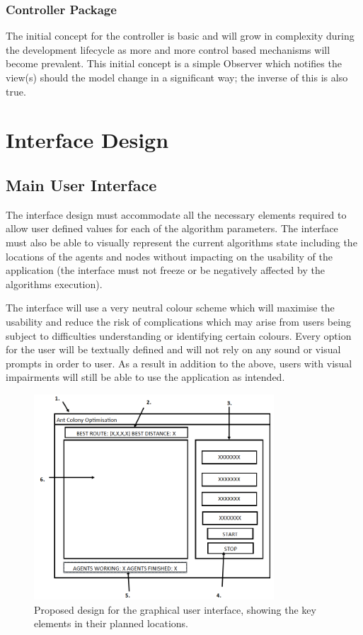 \subsubsection{Controller Package}
The initial concept for the controller is basic and will grow in complexity during the development lifecycle as more and more control based mechanisms will become prevalent. This initial concept is a simple Observer which notifies the view(s) should the model change in a significant way; the inverse of this is also true.

\section{Interface Design}
\subsection{Main User Interface}
\label{ssec:mainUI}
The interface design must accommodate all the necessary elements required to allow user defined values for each of the algorithm parameters. The interface must also be able to visually represent the current algorithms state including the locations of the agents and nodes without impacting on the usability of the application (the interface must not freeze or be negatively affected by the algorithms execution).

The interface will use a very neutral colour scheme which will maximise the usability and reduce the risk of complications which may arise from users being subject to difficulties understanding or identifying certain colours. Every option for the user will be textually defined and will not rely on any sound or visual prompts in order to user. As a result in addition to the above, users with visual impairments will still be able to use the application as intended.

\begin{figure}[H]
\centering
\includegraphics[width=0.8\textwidth]{Images/screen}
\caption{Proposed design for the graphical user interface, showing the key elements in their planned locations.}
\label{fig:interface}
\end{figure}

